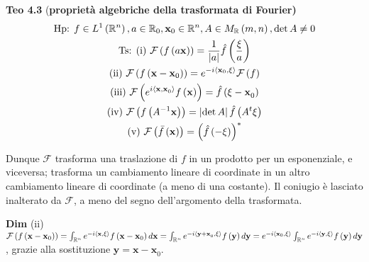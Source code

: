 \documentclass{article}
\begin{document}
\textbf{Teo 4.3} (\textbf{propriet\`{a} algebriche della trasformata di
Fourier)}%
\begin{gather*}
\text{Hp: }f\in L^{1}\left( 
\mathbb{R}
^{n}\right) ,a\in 
\mathbb{R}
_{0},\mathbf{x}_{0}\in 
\mathbb{R}
^{n},A\in M_{%
\mathbb{R}
}\left( m,n\right) ,\det A\neq 0 \\
\text{Ts: (i) }\mathcal{F}\left( f\left( a\mathbf{x}\right) \right) =\frac{1%
}{\left\vert a\right\vert }\hat{f}\left( \frac{\mathbf{\xi }}{a}\right) \\
\text{(ii) }\mathcal{F}\left( f\left( \mathbf{x-x}_{0}\right) \right)
=e^{-i\left\langle \mathbf{x}_{0}\mathbf{,\xi }\right\rangle }\mathcal{F}%
\left( f\right) \\
\text{(iii) }\mathcal{F}\left( e^{i\left\langle \mathbf{x,x}%
_{0}\right\rangle }f\left( \mathbf{x}\right) \right) =\hat{f}\left( \mathbf{%
\xi -x}_{0}\right) \\
\text{(iv) }\mathcal{F}\left( f\left( A^{-1}\mathbf{x}\right) \right)
=\left\vert \det A\right\vert \hat{f}\left( A^{t}\mathbf{\xi }\right) \\
\text{(v) }\mathcal{F}\left( \bar{f}\left( \mathbf{x}\right) \right) =\left( 
\hat{f}\left( -\mathbf{\xi }\right) \right) ^{\ast }
\end{gather*}

Dunque $\mathcal{F}$ trasforma una traslazione di $f$ in un prodotto per un
esponenziale, e viceversa; trasforma un cambiamento lineare di coordinate in
un altro cambiamento lineare di coordinate (a meno di una costante). Il
coniugio \`{e} lasciato inalterato da $\mathcal{F}$, a meno del segno
dell'argomento della trasformata.

\textbf{Dim }(ii) $\mathcal{F}\left( f\left( \mathbf{x-x}_{0}\right) \right)
=\int_{%
\mathbb{R}
^{n}}e^{-i\left\langle \mathbf{x,\xi }\right\rangle }f\left( \mathbf{x-x}%
_{0}\right) d\mathbf{x}=\int_{%
\mathbb{R}
^{n}}e^{-i\left\langle \mathbf{y+x}_{0}\mathbf{,\xi }\right\rangle }f\left( 
\mathbf{y}\right) d\mathbf{y}=e^{-i\left\langle \mathbf{x}_{0}\mathbf{,\xi }%
\right\rangle }\int_{%
\mathbb{R}
^{n}}e^{-i\left\langle \mathbf{y,\xi }\right\rangle }f\left( \mathbf{y}%
\right) d\mathbf{y}$, grazie alla sostituzione $\mathbf{y=x-x}_{0}$.
\end{document}
